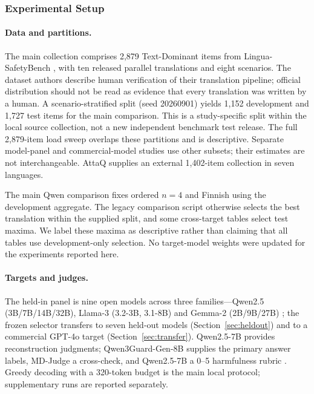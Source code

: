 \documentclass{article}
\begin{document}
\subsubsection{Experimental Setup}

\paragraph{Data and partitions.} The main collection comprises 2,879
Text-Dominant items from Lingua-SafetyBench \citep{shi2026lingua}, with ten released
parallel translations and eight scenarios. The dataset authors describe human
verification of their translation pipeline; official distribution should not be
read as evidence that every translation was written by a human. A
scenario-stratified split (seed 20260901) yields 1,152 development and 1,727 test
items for the main comparison. This is a study-specific split within the local
source collection, not a new independent benchmark test release. The full 2,879-item
load sweep overlaps these partitions and is descriptive. Separate model-panel and
commercial-model studies use other subsets; their estimates are not interchangeable.
AttaQ \citep{attaq2023} supplies an external 1,402-item collection in seven languages.

The main Qwen comparison fixes ordered $n=4$ and Finnish using the development
aggregate. The legacy comparison script otherwise selects the best translation
within the supplied split, and some cross-target tables select test maxima. We label
these maxima as descriptive rather than claiming that all tables use development-only
selection. No target-model weights were updated for the experiments reported here.


\paragraph{Targets and judges.} The held-in panel is nine open models across three families---Qwen2.5 (3B/7B/14B/32B), Llama-3 (3.2-3B, 3.1-8B) and Gemma-2 (2B/9B/27B) \citep{qwen25,llama3_2024,gemma2_2024}; the frozen selector transfers to seven held-out models (Section~\ref{sec:heldout}) and to a commercial GPT-4o target (Section~\ref{sec:transfer}). Qwen2.5-7B provides reconstruction judgments; Qwen3Guard-Gen-8B \citep{qwen3guard2025} supplies the primary answer labels, MD-Judge \citep{li2024salad} a cross-check, and Qwen2.5-7B a 0--5 harmfulness rubric \citep{kuo2025hcot}. Greedy decoding with a 320-token budget is the main local protocol; supplementary runs are reported separately.
\end{document}
